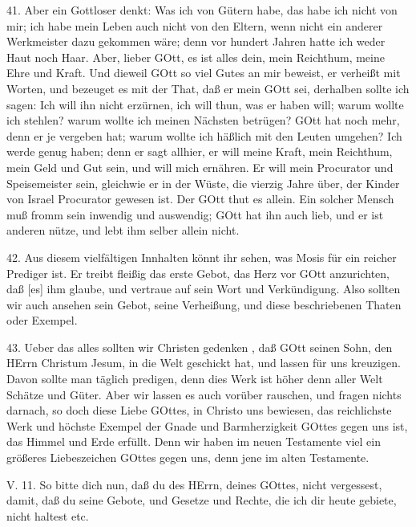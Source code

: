 41. Aber ein Gottloser denkt: Was ich von Gütern habe, das habe ich nicht von mir; ich habe mein Leben auch nicht von den Eltern, wenn nicht ein anderer Werkmeister dazu gekommen wäre; denn vor hundert Jahren hatte ich weder Haut noch Haar. Aber, lieber GOtt, es ist alles dein, mein Reichthum, meine Ehre und Kraft. Und dieweil GOtt so viel Gutes an mir beweist, er verheißt mit Worten, und bezeuget es mit der That, daß er mein GOtt sei, derhalben sollte ich sagen: Ich will ihn nicht erzürnen, ich will thun, was er haben will; warum wollte ich stehlen? warum wollte ich meinen Nächsten betrügen? GOtt hat noch mehr, denn er je vergeben hat; warum wollte ich häßlich mit den Leuten umgehen? Ich werde genug haben; denn er sagt allhier, er will meine Kraft, mein Reichthum, mein Geld und Gut sein, und will mich ernähren. Er will mein Procurator und Speisemeister sein, gleichwie er in der Wüste, die vierzig Jahre über, der Kinder von Israel Procurator gewesen ist. Der GOtt thut es allein. Ein solcher Mensch muß fromm sein inwendig und auswendig; GOtt hat ihn auch lieb, und er ist anderen nütze, und lebt ihm selber allein nicht.

42. Aus diesem vielfältigen Innhalten könnt ihr sehen, was Mosis für ein reicher Prediger ist. Er treibt fleißig das erste Gebot, das Herz vor GOtt anzurichten, daß [es] ihm glaube, und vertraue auf sein Wort und Verkündigung. Also sollten wir auch ansehen sein Gebot, seine Verheißung, und diese beschriebenen Thaten oder Exempel.

43. Ueber das alles sollten wir Christen gedenken
, daß GOtt seinen Sohn, den HErrn Christum Jesum, in die Welt geschickt hat, und lassen für uns kreuzigen. Davon sollte man täglich predigen, denn dies Werk ist höher denn aller Welt Schätze und Güter. Aber wir lassen es auch vorüber rauschen, und fragen nichts darnach, so doch diese Liebe GOttes, in Christo uns bewiesen, das reichlichste Werk und höchste Exempel der Gnade und Barmherzigkeit GOttes gegen uns ist, das Himmel und Erde erfüllt. Denn wir haben im neuen Testamente viel ein größeres Liebeszeichen GOttes gegen uns, denn jene im alten Testamente.

\begin{schriftzitat}
V. 11. So bitte dich nun, daß du des HErrn, deines GOttes, nicht vergessest, damit, daß du seine Gebote, und Gesetze und Rechte, die ich dir heute gebiete, nicht haltest etc.
\end{schriftzitat}

